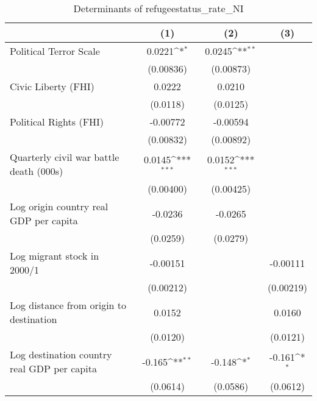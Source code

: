 \begin{table}[htbp]\centering
\def\sym#1{\ifmmode^{#1}\else\(^{#1}\)\fi}
\caption{Determinants of refugeestatus\_rate\_NI}
\begin{tabular}{l*{3}{c}}
\hline\hline
                    &\multicolumn{1}{c}{(1)}         &\multicolumn{1}{c}{(2)}         &\multicolumn{1}{c}{(3)}         \\
\hline
Political Terror Scale&      0.0221\sym{*}  &      0.0245\sym{**} &                     \\
                    &   (0.00836)         &   (0.00873)         &                     \\
[1em]
Civic Liberty (FHI) &      0.0222         &      0.0210         &                     \\
                    &    (0.0118)         &    (0.0125)         &                     \\
[1em]
Political Rights (FHI)&    -0.00772         &    -0.00594         &                     \\
                    &   (0.00832)         &   (0.00892)         &                     \\
[1em]
Quarterly civil war battle death (000s)&      0.0145\sym{***}&      0.0152\sym{***}&                     \\
                    &   (0.00400)         &   (0.00425)         &                     \\
[1em]
Log origin country real GDP per capita&     -0.0236         &     -0.0265         &                     \\
                    &    (0.0259)         &    (0.0279)         &                     \\
[1em]
Log migrant stock in 2000/1&    -0.00151         &                     &    -0.00111         \\
                    &   (0.00212)         &                     &   (0.00219)         \\
[1em]
Log distance from origin to destination&      0.0152         &                     &      0.0160         \\
                    &    (0.0120)         &                     &    (0.0121)         \\
[1em]
Log destination country real GDP per capita&      -0.165\sym{**} &      -0.148\sym{*}  &      -0.161\sym{*}  \\
                    &    (0.0614)         &    (0.0586)         &    (0.0612)         \\

\end{tabular}
\end{table}
